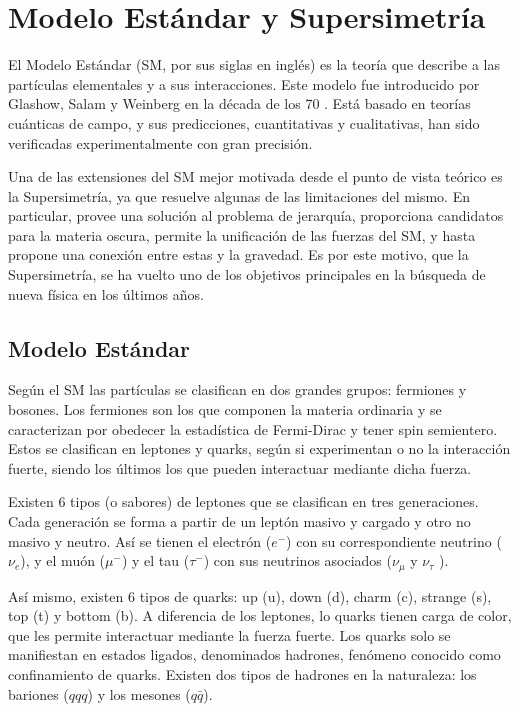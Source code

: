 \chapter{Modelo Estándar y Supersimetría}


El Modelo Estándar (SM, por sus siglas en inglés) es la teoría que describe a las partículas elementales y a sus interacciones. Este modelo fue introducido por Glashow, Salam y Weinberg en la década de los 70 \cite{Glashow:1961tr,PhysRevLett.19.1264}. Está basado en teorías cuánticas de campo, y sus predicciones, cuantitativas y cualitativas, han sido verificadas experimentalmente con gran precisión.

Una de las extensiones del SM mejor motivada desde el punto de vista teórico es la Supersimetría, ya que resuelve algunas de las limitaciones del mismo. En particular, provee una solución al problema de jerarquía, proporciona candidatos para la materia oscura, permite la unificación de las fuerzas del SM, y hasta propone una conexión entre estas y la gravedad. Es por este motivo, que la Supersimetría, se ha vuelto uno de los objetivos principales en la búsqueda de nueva física en los últimos años.

\section{Modelo Estándar}
 
Según el SM las partículas se clasifican en dos grandes grupos: fermiones y bosones. Los fermiones son los que componen la materia ordinaria y se caracterizan por obedecer la estadística de Fermi-Dirac y tener spin semientero. Estos se clasifican en leptones y quarks, según si experimentan o no la interacción fuerte, siendo los últimos los que pueden interactuar mediante dicha fuerza.  

Existen 6 tipos (o sabores) de leptones que se clasifican en tres generaciones. Cada generación se forma a partir de un leptón masivo y cargado y otro no masivo y neutro. Así se tienen el electrón ($e^{-}$) con su correspondiente neutrino ($\nu_{e}$), y el muón ($\mu^{-}$) y el tau ($\tau^{-}$) con sus neutrinos asociados ($\nu_{\mu}$ y $\nu_{\tau}$ ).


Así mismo, existen 6 tipos de quarks: up (u), down (d), charm (c), strange (s), top (t) y bottom (b). A diferencia de los leptones, lo quarks tienen carga de color, que les permite interactuar mediante la fuerza fuerte. Los quarks solo se manifiestan en estados ligados, denominados hadrones, fenómeno conocido
como confinamiento de quarks. Existen dos tipos de hadrones en la naturaleza: los bariones ($qqq$) y los mesones ($q\bar{q}$).


